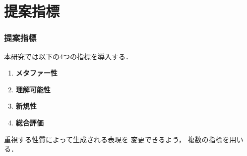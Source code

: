 \documentclass[12pt,usepdftitle=false]{beamer}
\begin{document}
%
%
%
%
%
%
%
%
%

\section{提案指標}
\begin{frame}
    \frametitle{提案指標}
    本研究では以下の4つの指標を導入する．

     \begin{enumerate}
         \item \textbf{メタファー性}

         \item \textbf{理解可能性}

         \item \textbf{新規性}

         \item \textbf{総合評価}

     \end{enumerate}

     \bigskip

     重視する性質によって生成される表現を
     変更できるよう，
     複数の指標を用いる．

\end{frame}
\end{document}
